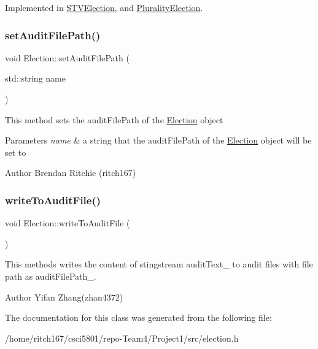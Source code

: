 Implemented in \hyperlink{classSTVElection_ac4e0339e3cb97add1a22c9af7233df17}{S\+T\+V\+Election}, and \hyperlink{classPluralityElection_a9517806e8ba40496c49013acc7ad9ca5}{Plurality\+Election}.

\mbox{\label{classElection_ad50f3b2f39c7e7ee96f1987c9dddb926}} 
\subsubsection{\texorpdfstring{set\+Audit\+File\+Path()}{setAuditFilePath()}}
{\footnotesize\ttfamily void Election\+::set\+Audit\+File\+Path (\begin{DoxyParamCaption}\item[{std\+::string}]{name }\end{DoxyParamCaption})\hspace{0.3cm}{\ttfamily [protected]}}

This method sets the audit\+File\+Path of the \hyperlink{classElection}{Election} object 
\begin{DoxyParams}{Parameters}
{\em name} & a string that the audit\+File\+Path of the \hyperlink{classElection}{Election} object will be set to \\
\hline
\end{DoxyParams}
\begin{DoxyAuthor}{Author}
Brendan Ritchie (ritch167) 
\end{DoxyAuthor}
\mbox{\label{classElection_abd52b6c894a9f2a0a0a104e9f290f9a7}} 
\subsubsection{\texorpdfstring{write\+To\+Audit\+File()}{writeToAuditFile()}}
{\footnotesize\ttfamily void Election\+::write\+To\+Audit\+File (\begin{DoxyParamCaption}{ }\end{DoxyParamCaption})\hspace{0.3cm}{\ttfamily [protected]}}

This methods writes the content of stingstream audit\+Text\+\_\+ to audit files with file path as audit\+File\+Path\+\_\+. \begin{DoxyAuthor}{Author}
Yifan Zhang(zhan4372) 
\end{DoxyAuthor}


The documentation for this class was generated from the following file\+:\begin{DoxyCompactItemize}
\item 
/home/ritch167/csci5801/repo-\/\+Team4/\+Project1/src/election.\+h\end{DoxyCompactItemize}
